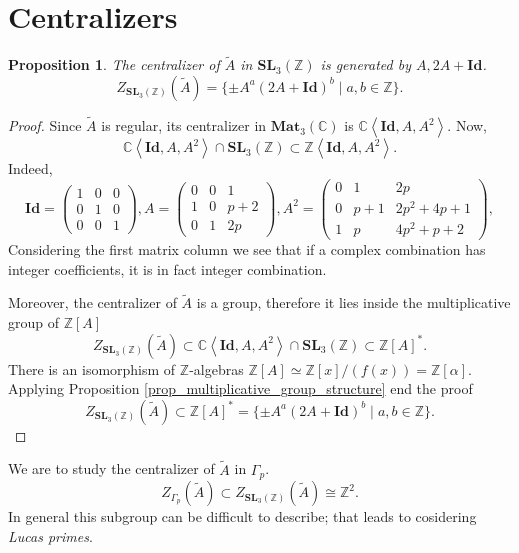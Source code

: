\documentclass[a4paper]{article}
\newtheorem{Prop}[Thm]{Proposition}
\newcommand{\C}{\mathbb{C}}        %
\newcommand{\Id}{\mathbf{Id}}        %
\newcommand{\SL}{\mathbf{SL}_3(\mathbb{Z})}        %
\newcommand{\Mat}{\mathbf{Mat}_3(\mathbb{C})}        %
\newcommand{\SLp}{\Gamma_p}        %
\begin{document}
\section{Centralizers}
\begin{Prop}
	\label{proposition_centralizer_in_sl}
The centralizer of $\tilde A$ in $\SL$
is generated by $A, 2A+\Id$.
$$Z_{\SL}(\tilde A) = \{ \pm A^a (2 A + \Id)^b \mid a, b \in \mathbb{Z} \} .$$ 
\end{Prop}
\begin{proof}
Since $\tilde A$ is regular, its centralizer in $ \Mat $ is $\C \left< \Id, A, A^2 \right> $.
Now, 
\[
\C \left< \Id, A, A^2 \right> \cap \SL 
\subset \mathbb{Z} 
\left< \Id, A, A^2 \right>
.\] 
Indeed,
\begin{equation}
\Id = 
\begin{pmatrix}
1 & 0 & 0 \\
0 & 1 & 0 \\
0 & 0 & 1
\end{pmatrix}, 
A = 
\begin{pmatrix}
0 & 0 & 1 \\
1 & 0 & p+2 \\
0 & 1 & 2p
\end{pmatrix}, 
A^2 = 
\begin{pmatrix}
0 & 1 & 2p \\
0 & p+1 & 2p^2+4p+1 \\
1 & p & 4p^2+p+2
\end{pmatrix}, 
\end{equation}
Considering the first matrix column we see that if a complex combination has integer coefficients, it is in fact integer combination.

Moreover, 
the centralizer of $\tilde A$ is a group, therefore it lies inside the multiplicative group of $\mathbb{Z}[A]$
\[
Z_{\SL}(\tilde A)  \subset 
\C \left< \Id, A, A^2 \right> \cap \SL 
\subset \mathbb{Z}[A]^*
.\] 
There is an isomorphism of $\mathbb{Z}$-algebras $\mathbb{Z}[A] \simeq \mathbb{Z}[x]/(f(x)) = \mathbb{Z}[\alpha]$.
Applying Proposition \ref{prop_multiplicative_group_structure} end the proof
\[
Z_{\SL}(\tilde A) 
\subset \mathbb{Z}[A]^* =\{ \pm A^a (2 A + \Id)^b \mid a, b \in \mathbb{Z} \}.\] 
\end{proof}

We are to study the centralizer of $\tilde A$ in $\SLp$.
\[
Z_{\SLp}(\tilde A) \subset 
Z_{\SL}(\tilde A) \cong \mathbb{Z}^2
.\] 
In general this subgroup can be difficult to describe; 
that leads to cosidering \emph{Lucas primes}.
\end{document}
